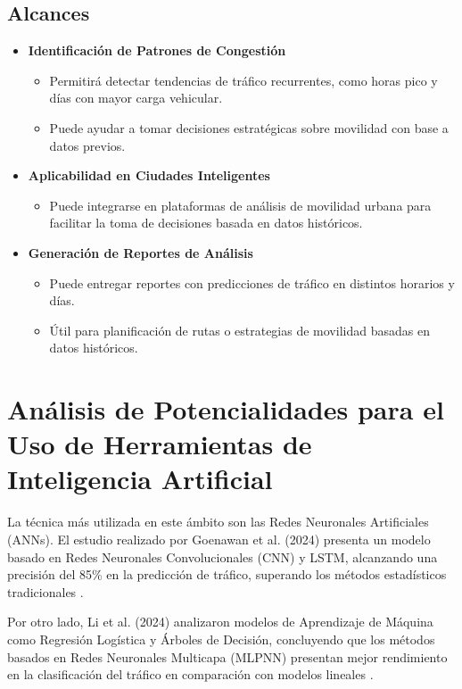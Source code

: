 \documentclass{svproc} %
\begin{document}
\subsection{Alcances}
\begin{itemize}
    \item \textbf{Identificación de Patrones de Congestión}
    \begin{itemize}
        \item Permitirá detectar tendencias de tráfico recurrentes, como horas pico y días con
        mayor carga vehicular.
        \item Puede ayudar a tomar decisiones estratégicas sobre movilidad con base a datos
        previos.
    \end{itemize}
    
    \item \textbf{Aplicabilidad en Ciudades Inteligentes}
    \begin{itemize}
        \item Puede integrarse en plataformas de análisis de movilidad urbana para facilitar la
        toma de decisiones basada en datos históricos.
    \end{itemize}
    
    \item \textbf{Generación de Reportes de Análisis}
    \begin{itemize}
        \item Puede entregar reportes con predicciones de tráfico en distintos horarios y días.
        \item Útil para planificación de rutas o estrategias de movilidad basadas en datos
        históricos.
    \end{itemize}
\end{itemize}


\section{Análisis de Potencialidades para el Uso de Herramientas de Inteligencia Artificial}
La técnica más utilizada en este ámbito son las Redes Neuronales Artificiales (ANNs). El
estudio realizado por Goenawan et al. (2024) presenta un modelo basado en Redes
Neuronales Convolucionales (CNN) y LSTM, alcanzando una precisión del 85\% en la
predicción de tráfico, superando los métodos estadísticos tradicionales \cite{Goenawan2024}.

Por otro lado, Li et al. (2024) analizaron modelos de Aprendizaje de Máquina como
Regresión Logística y Árboles de Decisión, concluyendo que los métodos basados en
Redes Neuronales Multicapa (MLPNN) presentan mejor rendimiento en la clasificación
del tráfico en comparación con modelos lineales \cite{Li2024}.
\end{document}
